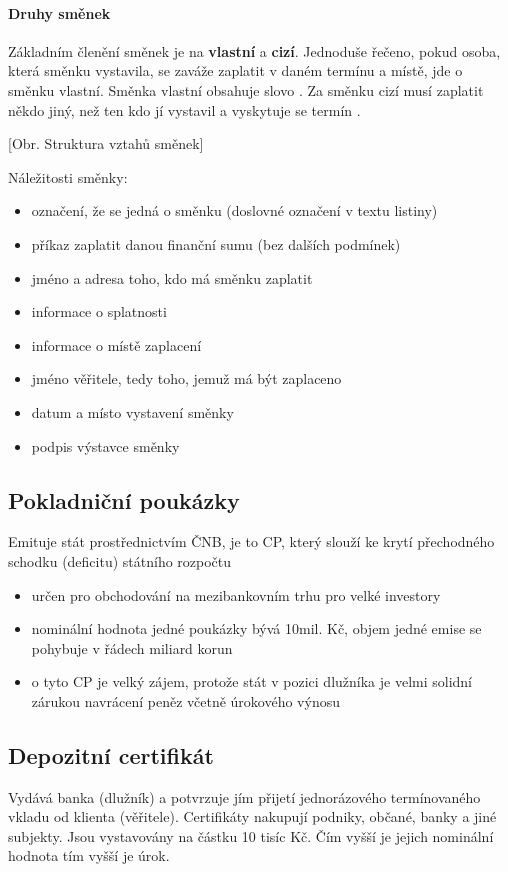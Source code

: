 \paragraph{Druhy směnek}
Základním členění směnek je na \textbf{vlastní} a \textbf{cizí}. Jednoduše řečeno, pokud osoba, která směnku vystavila, se zaváže 
zaplatit v daném termínu a místě, jde o směnku vlastní. Směnka vlastní obsahuje slovo . Za směnku cizí musí zaplatit někdo jiný, než ten kdo jí vystavil a vyskytuje se termín .

[Obr. Struktura vztahů směnek]

Náležitosti směnky:
\begin{itemize}    
    \item označení, že se jedná o směnku (doslovné označení v textu listiny)
    \item příkaz zaplatit danou finanční sumu (bez dalších podmínek)
    \item jméno a adresa toho, kdo má směnku zaplatit
    \item informace o splatnosti
    \item informace o místě zaplacení
    \item jméno věřitele, tedy toho, jemuž má být zaplaceno
    \item datum a místo vystavení směnky
    \item podpis výstavce směnky
\end{itemize}

\subsection*{Pokladniční poukázky}
Emituje stát prostřednictvím ČNB, je to CP, který slouží ke krytí přechodného schodku (deficitu) státního rozpočtu
\begin{itemize}  
    \item určen pro obchodování na mezibankovním trhu pro velké investory
    \item nominální hodnota jedné poukázky bývá 10mil. Kč, objem jedné emise se pohybuje v řádech miliard korun
    \item o tyto CP je velký zájem, protože stát v pozici dlužníka je velmi solidní zárukou navrácení peněz včetně úrokového výnosu
\end{itemize}

\subsection*{Depozitní certifikát}
Vydává banka (dlužník) a potvrzuje jím přijetí jednorázového termínovaného vkladu od klienta (věřitele). Certifikáty nakupují podniky, občané, banky a jiné subjekty. Jsou vystavovány na částku 10 tisíc Kč. Čím vyšší je jejich nominální hodnota tím vyšší je úrok.

